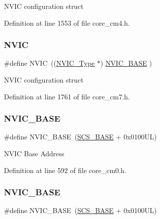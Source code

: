 N\+V\+IC configuration struct 

Definition at line 1553 of file core\+\_\+cm4.\+h.

\mbox{\label{group___c_m_s_i_s__core__base_gac8e97e8ce56ae9f57da1363a937f8a17}} 
\subsubsection{\texorpdfstring{N\+V\+IC}{NVIC}\hspace{0.1cm}{\footnotesize\ttfamily [7/7]}}
{\footnotesize\ttfamily \#define N\+V\+IC~((\hyperlink{struct_n_v_i_c___type}{N\+V\+I\+C\+\_\+\+Type}      $\ast$)     \hyperlink{group___c_m_s_i_s__core__base_gaa0288691785a5f868238e0468b39523d}{N\+V\+I\+C\+\_\+\+B\+A\+SE}     )}

N\+V\+IC configuration struct 

Definition at line 1761 of file core\+\_\+cm7.\+h.

\mbox{\label{group___c_m_s_i_s__core__base_gaa0288691785a5f868238e0468b39523d}} 
\subsubsection{\texorpdfstring{N\+V\+I\+C\+\_\+\+B\+A\+SE}{NVIC\_BASE}\hspace{0.1cm}{\footnotesize\ttfamily [1/7]}}
{\footnotesize\ttfamily \#define N\+V\+I\+C\+\_\+\+B\+A\+SE~(\hyperlink{group___c_m_s_i_s__core__base_ga3c14ed93192c8d9143322bbf77ebf770}{S\+C\+S\+\_\+\+B\+A\+SE} +  0x0100\+U\+L)}

N\+V\+IC Base Address 

Definition at line 592 of file core\+\_\+cm0.\+h.

\mbox{\label{group___c_m_s_i_s__core__base_gaa0288691785a5f868238e0468b39523d}} 
\subsubsection{\texorpdfstring{N\+V\+I\+C\+\_\+\+B\+A\+SE}{NVIC\_BASE}\hspace{0.1cm}{\footnotesize\ttfamily [2/7]}}
{\footnotesize\ttfamily \#define N\+V\+I\+C\+\_\+\+B\+A\+SE~(\hyperlink{group___c_m_s_i_s__core__base_ga3c14ed93192c8d9143322bbf77ebf770}{S\+C\+S\+\_\+\+B\+A\+SE} +  0x0100\+U\+L)}

